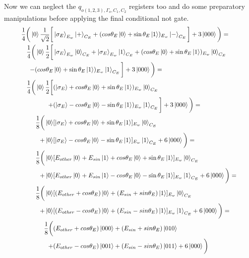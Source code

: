 \newpage
\noindent
Now we can neglect the $q_{o(1,2,3),\Gamma_o,C_1,C_2}$ registers too and do some preparatory manipulations before applying the final conditional not gate. 
\begin{equation}
   \resizebox{.9\hsize}{!}{$\begin{split}
        \frac{1}{4}\bigg(\ket{0}\frac{1}{\sqrt{2}}\bigg[&\ket{\sigma_E}_{E_w}\ket{+}_{C_E}+(cos\theta_E\ket{0}+\sin\theta_E\ket{1})_{E_w}\ket{-}_{C_E}\bigg]+3\ket{000}\bigg)=\\
        \frac{1}{4}\bigg(\ket{0}\frac{1}{2}\bigg[&\ket{\sigma_E}_{E_w}\ket{0}_{C_E}+\ket{\sigma_E}_{E_w}\ket{1}_{C_E}+(cos\theta_E\ket{0}+\sin\theta_E\ket{1})_{E_w}\ket{0}_{C_E}\\
        -(cos\theta_E&\ket{0}+\sin\theta_E\ket{1})_{E_w}\ket{1}_{C_E}\bigg]+3\ket{000}\bigg)=\\
        \frac{1}{4}\bigg(
        \ket{0}\frac{1}{2}\bigg[&
        (\ket{\sigma_E}+cos\theta_E\ket{0}+\sin\theta_E\ket{1})_{E_w}\ket{0}_{C_E}\\
        +&(\ket{\sigma_E}-cos\theta_E\ket{0}-\sin\theta_E\ket{1})_{E_w}\ket{1}_{C_E}
        \bigg]+3\ket{000}\bigg)=\\
        \frac{1}{8}\bigg(
        \ket{0}&
        [\ket{\sigma_E}+cos\theta_E\ket{0}+\sin\theta_E\ket{1}]_{E_w}\ket{0}_{C_E}\\
        +\ket{0}&[\ket{\sigma_E}-cos\theta_E\ket{0}-\sin\theta_E\ket{1}]_{E_w}\ket{1}_{C_E}
        +6\ket{000}\bigg)=\\
        \frac{1}{8}\bigg(
         \ket{0}&[E_{other}\ket{0}+E_{sin}\ket{1}+cos\theta_E\ket{0}+\sin\theta_E\ket{1}]_{E_w}\ket{0}_{C_E}\\
        +\ket{0}&[E_{other}\ket{0}+E_{sin}\ket{1}-cos\theta_E\ket{0}-\sin\theta_E\ket{1}]_{E_w}\ket{1}_{C_E}
        +6\ket{000}\bigg)=\\
        \frac{1}{8}\bigg(
        \ket{0}&[(E_{other}+cos\theta_E)\ket{0}+(E_{sin}+sin\theta_E)\ket{1}]_{E_w}\ket{0}_{C_E}\\
        +\ket{0}&[(E_{other}-cos\theta_E)\ket{0}+(E_{sin}-sin\theta_E)\ket{1}]_{E_w}\ket{1}_{C_E}
        +6\ket{000}\bigg)=\\
        \frac{1}{8}\bigg(
        &(E_{other}+cos\theta_E)\ket{000}+(E_{sin}+sin\theta_E)\ket{010}\\+
        &(E_{other}-cos\theta_E)\ket{001}+(E_{sin}-sin\theta_E)\ket{011}+6\ket{000}\bigg)\\
   \end{split}$}
\end{equation}

